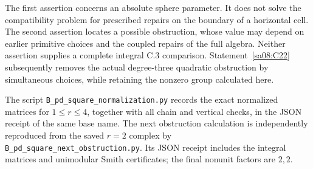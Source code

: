 The first assertion concerns an absolute sphere
parameter. It does not solve the compatibility
problem for prescribed repairs on the boundary
of a horizontal cell. The second assertion
locates a possible obstruction, whose value
may depend on earlier primitive choices and
the coupled repairs of the full algebra.
Neither assertion supplies a complete
integral C.3 comparison.
Statement~\ref{sa08:C22} subsequently removes
the actual degree-three quadratic obstruction
by simultaneous choices, while retaining
the nonzero group calculated here.

The script
\texttt{B\_pd\_square\_normalization.py}
records the exact normalized matrices
for $1\leq r\leq4$, together with all chain
and vertical checks, in the JSON receipt of the same base name.
The next obstruction
calculation is independently reproduced from
the saved $r=2$ complex by
\texttt{B\_pd\_square\_next\_obstruction.py}.
Its JSON receipt includes the integral
matrices and unimodular Smith certificates;
the final nonunit factors are $2,2$.
